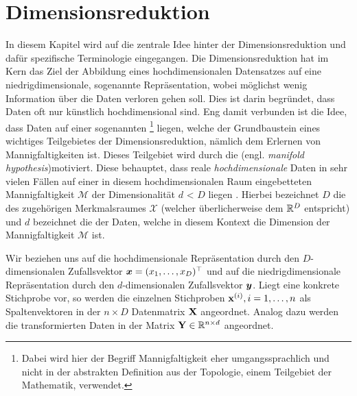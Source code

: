 \chapter{Dimensionsreduktion}
\label{ch:Dimensionsreduktion}

In diesem Kapitel wird auf die zentrale Idee hinter der Dimensionsreduktion und dafür spezifische Terminologie eingegangen.
Die Dimensionsreduktion hat im Kern das Ziel der Abbildung eines hochdimensionalen Datensatzes auf eine niedrigdimensionale, sogenannte  Repräsentation, wobei möglichst wenig Information über die Daten verloren gehen soll. Dies ist darin begründet, dass Daten oft nur künstlich hochdimensional sind. Eng damit verbunden ist die Idee, dass Daten auf einer sogenannten \footnote{Dabei wird hier der Begriff Mannigfaltigkeit eher umgangssprachlich und nicht in der abstrakten Definition aus der Topologie, einem Teilgebiet der Mathematik, verwendet.} liegen, welche der Grundbaustein eines wichtiges Teilgebietes der Dimensionsreduktion, nämlich dem Erlernen von Mannigfaltigkeiten \parencite{Cayton.2005} ist. Dieses Teilgebiet wird durch die  (engl. \textit{manifold hypothesis})\addref motiviert. Diese behauptet, dass
reale \textit{hochdimensionale} Daten in sehr vielen Fällen auf einer in diesem hochdimensionalen Raum eingebetteten Mannigfaltigkeit $\mathcal{M}$ der Dimensionalität $d$ < $D$ liegen \parencite[vgl.][1]{Cayton.2005}. 
Hierbei bezeichnet $D$ die  des zugehörigen Merkmalsraumes $\mathcal{X}$ (welcher überlicherweise dem $\mathbb{R}^D$ entspricht) und $d$ bezeichnet die  der Daten, welche in diesem Kontext die Dimension der Mannigfaltigkeit $\mathcal{M}$ ist.

Wir beziehen uns auf die hochdimensionale Repräsentation durch den $D$-dimensionalen Zufallsvektor $\bm{x} = (x_1, \ldots, x_D)^\top$ und auf die niedrigdimensionale Repräsentation durch den $d$-dimensionalen Zufallsvektor $\bm{y}$.
Liegt eine konkrete Stichprobe vor, so werden die einzelnen Stichproben $\mathbf{x}^{(i)}, i = 1,\ldots,n$ als Spaltenvektoren in der $n \times D$ Datenmatrix $\mathbf{X}$ angeordnet. Analog dazu werden die transformierten Daten in der Matrix $\mathbf{Y} \in \mathbb{R}^{n \times d}$ angeordnet.


